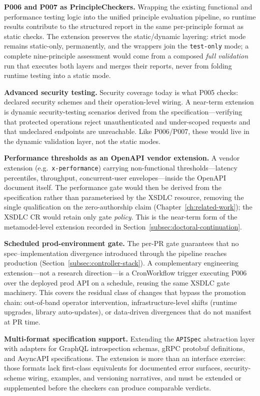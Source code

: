 \textbf{P006 and P007 as PrincipleCheckers.} Wrapping the existing functional and performance testing logic into the unified principle evaluation pipeline, so runtime results contribute to the structured report in the same per-principle format as static checks. The extension preserves the static/dynamic layering: strict mode remains static-only, permanently, and the wrappers join the \texttt{test-only} mode; a complete nine-principle assessment would come from a composed \emph{full validation} run that executes both layers and merges their reports, never from folding runtime testing into a static mode.

\textbf{Advanced security testing.} Security coverage today is what P005 checks: declared security schemes and their operation-level wiring. A near-term extension is dynamic security-testing scenarios derived from the specification---verifying that protected operations reject unauthenticated and under-scoped requests and that undeclared endpoints are unreachable. Like P006/P007, these would live in the dynamic validation layer, not the static modes.

\textbf{Performance thresholds as an OpenAPI vendor extension.} A vendor extension (e.g.\ \texttt{x-performance}) carrying non-functional thresholds---latency percentiles, throughput, concurrent-user envelopes---inside the OpenAPI document itself. The performance gate would then be derived from the specification rather than parameterised by the XSDLC resource, removing the single qualification on the zero-authorship claim (Chapter~\ref{ch:related-work}); the XSDLC CR would retain only gate \emph{policy}. This is the near-term form of the metamodel-level extension recorded in Section~\ref{subsec:doctoral-continuation}.

\textbf{Scheduled prod-environment gate.} The per-PR gate guarantees that no spec--implementation divergence introduced through the pipeline reaches production (Section~\ref{subsec:controller-stack}). A complementary engineering extension---not a research direction---is a CronWorkflow trigger executing P006 over the deployed prod API on a schedule, reusing the same XSDLC gate machinery. This covers the residual class of changes that bypass the promotion chain: out-of-band operator intervention, infrastructure-level shifts (runtime upgrades, library auto-updates), or data-driven divergences that do not manifest at PR time.

\textbf{Multi-format specification support.} Extending the \texttt{APISpec} abstraction layer with adapters for GraphQL introspection schemas, gRPC protobuf definitions, and AsyncAPI specifications. The extension is more than an interface exercise: those formats lack first-class equivalents for documented error surfaces, security-scheme wiring, examples, and versioning narratives, and must be extended or supplemented before the checkers can produce comparable verdicts.

